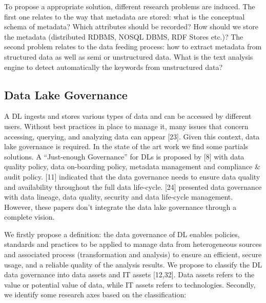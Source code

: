 \documentclass[a4paper,12pt,notitlepage,twoside,openright]{article}
\begin{document}
To propose a appropriate solution, different research problems are
induced. The first one relates to the way that metadata are stored: what
is the conceptual schema of metadata? Which attributes should be
recorded? How should we store the metadata (distributed RDBMS, NOSQL
DBMS, RDF Stores etc.)? The second problem relates to the data feeding
process: how to extract metadata from structured data as well as semi or
unstructured data. What is the text analysis engine to detect
automatically the keywords from unstructured data?

\hypertarget{data-lake-governance}{%
\subsection{Data Lake Governance}\label{data-lake-governance}}

A DL ingests and stores various types of data and can be accessed by
different users. Without best practices in place to manage it, many
issues that concern accessing, querying, and analyzing data can appear
{[}23{]}. Given this context, data lake governance is required. In the
state of the art work we find some partials solutions. A ``Just-enough
Governance'' for DLs is proposed by {[}8{]} with data quality policy,
data on-boarding policy, metadata management and compliance \& audit
policy. {[}11{]} indicated that the data governance needs to ensure data
quality and availability throughout the full data life-cycle. {[}24{]}
presented data governance with data lineage, data quality, security and
data life-cycle management. However, these papers don't integrate the
data lake governance through a complete vision.

We firstly propose a definition: the data governance of DL enables
policies, standards and practices to be applied to manage data from
heterogeneous sources and associated process (transformation and
analysis) to ensure an efficient, secure usage, and a reliable quality
of the analysis results. We propose to classify the DL data governance
into data assets and IT assets {[}12,32{]}. Data assets refers to the
value or potential value of data, while IT assets refers to
technologies. Secondly, we identify some research axes based on the
classification:
\end{document}
